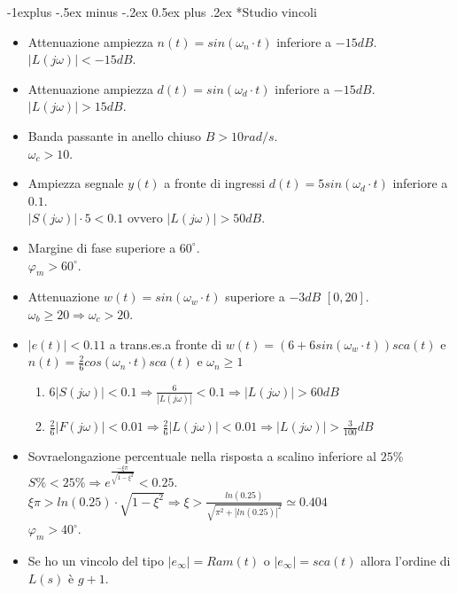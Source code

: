 \documentclass[10pt,landscape, a4paper]{scrartcl} %
\makeatletter
\renewcommand{\subsection}{\@startsection{subsection}{2}{0mm}%
                                {-1explus -.5ex minus -.2ex}%
                                {0.5ex plus .2ex}%
                                {\normalfont\normalsize\bfseries}}
\makeatother
\begin{document}
\begin{multicols*}{3}
\subsection*{Studio vincoli}
\begin{itemize}
	\item Attenuazione ampiezza $n(t) = sin(\omega_n\cdot t)$ inferiore a $-15 dB$.\\
		$|L(j\omega)| < -15 dB$.
	\item Attenuazione ampiezza $d(t) = sin(\omega_d\cdot t)$ inferiore a $-15 dB$.\\
		$|L(j\omega)| > 15 dB$.
	\item Banda passante in anello chiuso $B > 10 rad/s$.\\
		$\omega_c > 10$.
	\item Ampiezza segnale $y(t)$ a fronte di ingressi $d(t) = 5sin(\omega_d \cdot t)$ inferiore a $0.1$.\\
		$|S(j\omega)| \cdot 5 < 0.1$ ovvero $|L(j\omega)| > 50 dB$.
	\item Margine di fase superiore a $60^{\circ}$.\\
		$\varphi_m > 60^{\circ}$.
	\item Attenuazione $w(t) = sin (\omega_w \cdot t)$ superiore a $-3 dB$ $[0,20]$.\\
		$\omega_b \geq 20 \Rightarrow \omega_c > 20$.
	\item $|e(t)| < 0.11$ a trans.es.a fronte di $w(t) = (6 + 6sin(\omega_w \cdot t)) sca(t)$ e $n(t) = \frac{2}{6} cos(\omega_n \cdot t) sca(t)$ e $\omega_n \geq 1$
		\begin{enumerate}
			\item $6|S(j\omega)| < 0.1 \Rightarrow \frac{6}{|L(j\omega)|} < 0.1 \Rightarrow |L(j\omega)| > 60 dB$
			\item $\frac{2}{6}|F(j\omega)| < 0.01 \Rightarrow \frac{2}{6}|L(j\omega)| < 0.01 \Rightarrow |L(j\omega)| > \frac{3}{100} dB$
		\end{enumerate}		
	\item Sovraelongazione percentuale nella risposta a scalino inferiore al $25\%$\\
		$S\% < 25\% \Rightarrow e^{\frac{-\xi \pi}{\sqrt{1 - \xi^2}}} < 0.25$.\\
		$\xi \pi > ln(0.25) \cdot \sqrt{1 - \xi^2} \Rightarrow \xi > \frac{ln(0.25)}{\sqrt{\pi^2 + |ln(0.25)|^2}} \simeq 0.404$\\
		$\varphi_m > 40^{\circ}$.
	\item Se ho un vincolo del tipo $|e_\infty| = Ram(t)$ o $|e_\infty| = sca(t)$ allora l'ordine di $L(s)$ è $g+1$. 

\end{itemize}
\end{multicols*}
\end{document}
